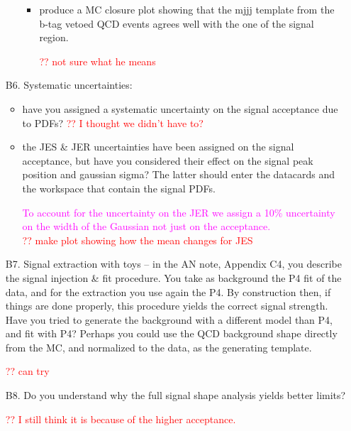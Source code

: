 \documentclass[paper=a4, fontsize=11pt]{scrartcl}
\begin{document}
\begin{itemize}
\begin{itemize}
\begin{itemize}
\item produce a MC closure plot showing that the mjjj template from the b-tag vetoed QCD events agrees well with the one of the signal region.

\textcolor{red}{?? not sure what he means}\\

\end{itemize}
\end{itemize}
\item[B6.] Systematic uncertainties: 
\begin{itemize}
\item have you assigned a systematic uncertainty on the signal acceptance due to PDFs? 
\textcolor{red}{?? I thought we didn't have to?}\\
\item the JES \& JER uncertainties have been assigned on the signal acceptance, but have you considered their effect on the signal peak position and gaussian sigma? The latter should enter the datacards and the workspace that contain the signal PDFs.

\textcolor{magenta}{To account for the uncertainty on the JER we assign a 10\% uncertainty on the width of the Gaussian not just on the acceptance.}\\
\textcolor{red}{?? make plot showing how the mean changes for JES}\\
\end{itemize}

\item[B7.] Signal extraction with toys -- in the AN note, Appendix C4, you describe the signal injection \& fit procedure. You take as background the P4 fit of the data, and for the extraction you use again the P4. By construction then, if things are done properly, this procedure yields the correct signal strength. Have you tried to generate the background with a different model than P4, and fit with P4? Perhaps you could use the QCD background shape directly from the MC, and normalized to the data, as the generating template.

\textcolor{red}{?? can try}\\


\item[B8.] Do you understand why the full signal shape analysis yields better limits?

\textcolor{red}{?? I still think it is because of the higher acceptance.}\\

\end{itemize}
\end{document}
